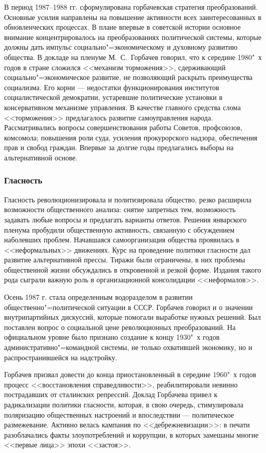 В период 1987--1988 гг. сформулирована горбачевская стратегия преобразований. Основные усилия направлены на повышение активности всех заинтересованных в обновленческих процессах. В плане впервые в советской истории основное внимание концентрировалось на преобразованиях политической системы, которые должны дать импульс социально"=экономическому и духовному развитию общества. В докладе на пленуме М.~С.~Горбачев говорил, что к середине 1980"~х годов в стране сложился <<механизм торможения>>, сдерживающий социально"=экономическое развитие, не позволяющий раскрыть преимущества социализма. Его корни --- недостатки функционирования институтов социалистической демократии, устаревшие политические установки в консервативном механизме управления. В качестве главного средства слома <<торможения>> предлагалось развитие самоуправления народа. Рассматривались вопросы совершенствования работы Советов, профсоюзов, комсомола; повышения роли суда, усиления прокурорского надзора, обеспечения прав и свобод граждан. Впервые за долгие годы предлагались выборы на альтернативной основе.

\subsubsection{\textbf{Гласность}}
Гласность революционизировала и политизировала общество, резко расширила возможности общественного анализа: снятие запретных тем, возможность задавать любые вопросы и предлагать варианты ответов.  Решения январского пленума пробудили общественную активность, связанную с обсуждением наболевших проблем. Начавшаяся самоорганизация общества проявилась в <<неформальных>> движениях. Курс на проведение политики гласности дал развитие альтернативной прессы. Тиражи были ограничены, в них проблемы общественной жизни обсуждались в откровенной и резкой форме. Издания такого рода сыграли важную роль в организационной консолидации <<неформалов>>. 

Осень 1987 г. стала определенным водоразделом в развитии общественно"=политической ситуации в СССР. Горбачев говорил и о значении внутрипартийных дискуссий, которые помогали выработке нужных решений. Был поставлен вопрос о социальной цене революционных преобразований. На официальном уровне было признано создание к концу 1930"~х годов административно"=командной системы, не только охватившей экономику, но и распространившейся на надстройку. 

Горбачев призвал довести до конца приостановленный в середине 1960"~х годов процесс <<восстановления справедливости>>, реабилитировали невинно пострадавших от сталинских репрессий. Доклад Горбачева привел к радикализации политики гласности, которая, в свою очередь, стимулировала поляризацию общественных настроений и впоследствии --- политическое размежевание. Активно велась кампания по <<дебрежневизации>>: в печати разоблачались факты злоупотреблений и коррупции, в которых замешаны многие <<первые лица>> эпохи <<застоя>>. 

